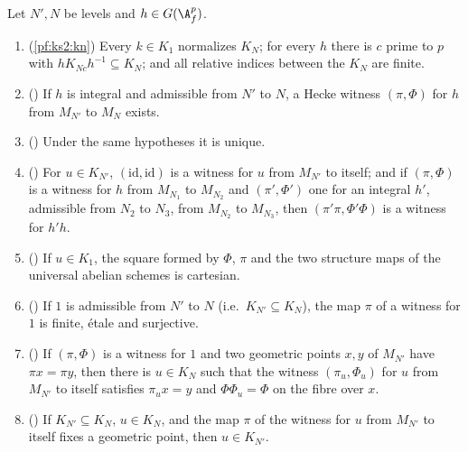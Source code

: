 \begin{lemma}\label{pf:ks2:wit}
Let $N',N$ be levels and $h\in\kstwoG$.
\begin{enumerate}
\item\label{pf:ks2:wit:kn} (\cref{pf:ks2:kn}) Every $k\in K_1$ normalizes
  $K_N$; for every $h$ there is $c$ prime to $p$ with $hK_{Nc}h^{-1}\subseteq K_N$; and all
  relative indices between the $K_N$ are finite.
\item\label{pf:ks2:wit:ex} () If $h$ is integral and
  admissible from $N'$ to $N$, a Hecke witness $(\pi,\Phi)$ for $h$ from $M_{N'}$ to $M_N$ exists.
\item\label{pf:ks2:wit:uniq} () Under the same
  hypotheses it is unique.
\item\label{pf:ks2:wit:comp} () For $u\in K_{N'}$,
  $(\mathrm{id},\mathrm{id})$ is a witness for $u$ from $M_{N'}$ to itself; and if $(\pi,\Phi)$ is a
  witness for $h$ from $M_{N_1}$ to $M_{N_2}$ and $(\pi',\Phi')$ one for an integral $h'$,
  admissible from $N_2$ to $N_3$, from $M_{N_2}$ to $M_{N_3}$, then $(\pi'\pi,\Phi'\Phi)$ is a
  witness for $h'h$.
\item\label{pf:ks2:wit:cart} () If $u\in K_1$, the
  square formed by $\Phi$, $\pi$ and the two structure maps of the universal abelian schemes is
  cartesian.
\item\label{pf:ks2:wit:one} () If $1$ is admissible from
  $N'$ to $N$ (i.e.\ $K_{N'}\subseteq K_N$), the map $\pi$ of a witness for $1$ is finite, \'etale
  and surjective.
\item\label{pf:ks2:wit:trans} () If $(\pi,\Phi)$ is a
  witness for $1$ and two geometric points $x,y$ of $M_{N'}$ have $\pi x=\pi y$, then there is
  $u\in K_N$ such that the witness $(\pi_u,\Phi_u)$ for $u$ from $M_{N'}$ to itself satisfies
  $\pi_u x=y$ and $\Phi\Phi_u=\Phi$ on the fibre over $x$.
\item\label{pf:ks2:wit:free} () If $K_{N'}\subseteq
  K_N$, $u\in K_N$, and the map $\pi$ of the witness for $u$ from $M_{N'}$ to itself fixes a
  geometric point, then $u\in K_{N'}$.
\end{enumerate}
\end{lemma}

